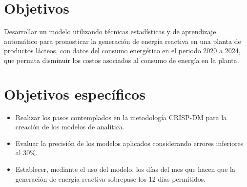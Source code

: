 \section{Objetivos}

Desarrollar un modelo utilizando t\'ecnicas estad\'isticas y de aprendizaje autom\'atico 
para pronosticar la generaci\'on de energ\'ia reactiva en una planta 
de productos l\'acteos, con datos del consumo energ\'etico en el 
periodo 2020 a 2024, que permita disminuir los costos asociados al 
consumo de energ\'ia en la planta.


\section{Objetivos espec\'ificos}
\begin{itemize}
    \item Realizar los pasos contemplados en la metodolog\'ia CRISP-DM para la creaci\'on de los modelos de anal\'itica.
    \item Evaluar la precisi\'on de los modelos aplicados considerando errores inferiores al 30\%.
    \item Establecer, mediante el uso del modelo, los d\'ias del mes que hacen que la generaci\'on de energ\'ia reactiva sobrepase los 12 d\'ias permitidos.
\end{itemize}


